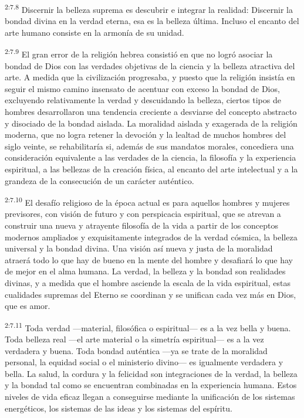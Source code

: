 \par
\textsuperscript{2:7.8} Discernir la belleza suprema es descubrir e integrar la realidad: Discernir la bondad divina en la verdad eterna, esa es la belleza última. Incluso el encanto del arte humano consiste en la armonía de su unidad.

\par
\textsuperscript{2:7.9} El gran error de la religión hebrea consistió en que no logró asociar la bondad de Dios con las verdades objetivas de la ciencia y la belleza atractiva del arte. A medida que la civilización progresaba, y puesto que la religión insistía en seguir el mismo camino insensato de acentuar con exceso la bondad de Dios, excluyendo relativamente la verdad y descuidando la belleza, ciertos tipos de hombres desarrollaron una tendencia creciente a desviarse del concepto abstracto y disociado de la bondad aislada. La moralidad aislada y exagerada de la religión moderna, que no logra retener la devoción y la lealtad de muchos hombres del siglo veinte, se rehabilitaría si, además de sus mandatos morales, concediera una consideración equivalente a las verdades de la ciencia, la filosofía y la experiencia espiritual, a las bellezas de la creación física, al encanto del arte intelectual y a la grandeza de la consecución de un carácter auténtico.

\par
\textsuperscript{2:7.10} El desafío religioso de la época actual es para aquellos hombres y mujeres previsores, con visión de futuro y con perspicacia espiritual, que se atrevan a construir una nueva y atrayente filosofía de la vida a partir de los conceptos modernos ampliados y exquisitamente integrados de la verdad cósmica, la belleza universal y la bondad divina. Una visión así nueva y justa de la moralidad atraerá todo lo que hay de bueno en la mente del hombre y desafiará lo que hay de mejor en el alma humana. La verdad, la belleza y la bondad son realidades divinas, y a medida que el hombre asciende la escala de la vida espiritual, estas cualidades supremas del Eterno se coordinan y se unifican cada vez más en Dios, que es amor.

\par
\textsuperscript{2:7.11} Toda verdad ---material, filosófica o espiritual--- es a la vez bella y buena. Toda belleza real ---el arte material o la simetría espiritual--- es a la vez verdadera y buena. Toda bondad auténtica ---ya se trate de la moralidad personal, la equidad social o el ministerio divino--- es igualmente verdadera y bella. La salud, la cordura y la felicidad son integraciones de la verdad, la belleza y la bondad tal como se encuentran combinadas en la experiencia humana. Estos niveles de vida eficaz llegan a conseguirse mediante la unificación de los sistemas energéticos, los sistemas de las ideas y los sistemas del espíritu.

